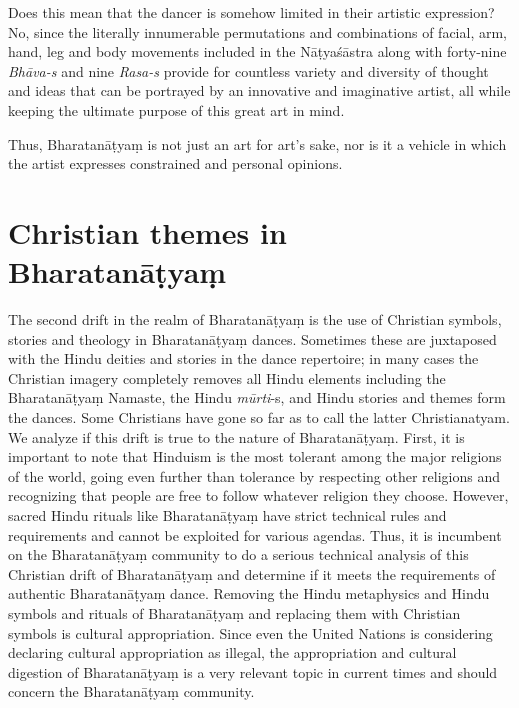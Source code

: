\vskip -2pt

Does this mean that the dancer is somehow limited in their artistic expression? No, since the literally innumerable permutations and combinations of facial, arm, hand, leg and body movements included in the Nāṭyaśāstra along with forty-nine \textit{Bhāva-s} and nine \textit{Rasa-s} provide for countless variety and diversity of thought and ideas that can be portrayed by an innovative and imaginative artist, all while keeping the ultimate purpose of this great art in mind. 

\vskip -2pt

Thus, Bharatanāṭyaṃ is not just an art for art’s sake, nor is it a vehicle in which the artist expresses constrained and personal opinions.


\section*{Christian themes in Bharatanāṭyaṃ}

The second drift in the realm of Bharatanāṭyaṃ is the use of Christian symbols, stories and theology in Bharatanāṭyaṃ dances. Sometimes these are juxtaposed with the Hindu deities and stories in the dance repertoire; in many cases the Christian imagery completely removes all Hindu elements including the Bharatanāṭyaṃ Namaste, the Hindu \textit{mūrti}-s, and Hindu stories and themes form the dances. Some Christians have gone so far as to call the latter Christianatyam. We analyze if this drift is true to the nature of Bharatanāṭyaṃ. First, it is important to note that Hinduism is the most tolerant among the major religions of the world, going even further than tolerance by respecting other religions and recognizing that people are free to follow whatever religion they choose. However, sacred Hindu rituals like Bharatanāṭyaṃ have strict technical rules and requirements and cannot be exploited for various agendas. Thus, it is incumbent on the Bharatanāṭyaṃ community to do a serious technical analysis of this Christian drift of Bharatanāṭyaṃ and determine if it meets the requirements of authentic Bharatanāṭyaṃ dance. Removing the Hindu metaphysics and Hindu symbols and rituals of Bharatanāṭyaṃ and replacing them with Christian symbols is cultural appropriation. Since even the United Nations is considering declaring cultural appropriation as illegal, the appropriation and cultural digestion of Bharatanāṭyaṃ is a very relevant topic in current times and should concern the Bharatanāṭyaṃ community.

